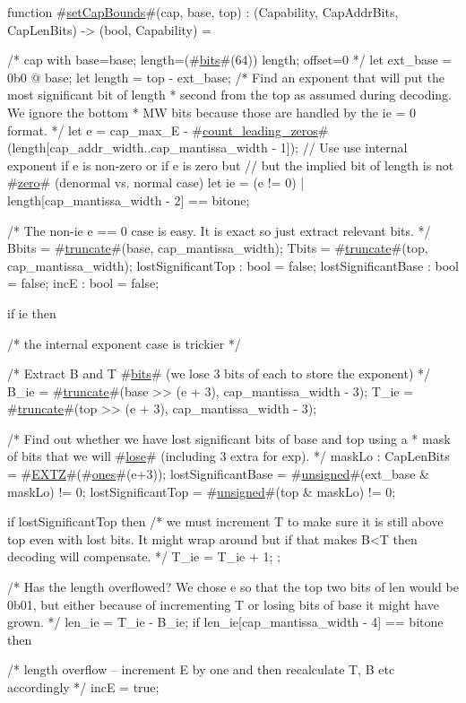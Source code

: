 function #\hyperref[sailRISCVzsetCapBounds]{setCapBounds}#(cap, base, top) : (Capability, CapAddrBits, CapLenBits) -> (bool, Capability) = {
  /* {cap with base=base; length=(#\hyperref[sailRISCVzbits]{bits}#(64)) length; offset=0} */
  let ext_base = 0b0 @ base;
  let length = top - ext_base;
  /* Find an exponent that will put the most significant bit of length
   * second from the top as assumed during decoding. We ignore the bottom
   * MW bits because those are handled by the ie = 0 format.
   */
  let e = cap_max_E - #\hyperref[sailRISCVzcountzyleadingzyzzeros]{count\_leading\_zeros}#(length[cap_addr_width..cap_mantissa_width - 1]);
  // Use use internal exponent if e is non-zero or if e is zero but
  // but the implied bit of length is not #\hyperref[sailRISCVzzzero]{zero}# (denormal vs. normal case)
  let ie = (e != 0) | length[cap_mantissa_width - 2] == bitone;

  /* The non-ie e == 0 case is easy. It is exact so just extract relevant bits. */
  Bbits = #\hyperref[sailRISCVztruncate]{truncate}#(base, cap_mantissa_width);
  Tbits = #\hyperref[sailRISCVztruncate]{truncate}#(top, cap_mantissa_width);
  lostSignificantTop : bool = false;
  lostSignificantBase : bool = false;
  incE : bool = false;

  if ie then {
    /* the internal exponent case is trickier */

    /* Extract B and T #\hyperref[sailRISCVzbits]{bits}# (we lose 3 bits of each to store the exponent) */
    B_ie = #\hyperref[sailRISCVztruncate]{truncate}#(base >> (e + 3), cap_mantissa_width - 3);
    T_ie = #\hyperref[sailRISCVztruncate]{truncate}#(top >> (e + 3), cap_mantissa_width - 3);

    /* Find out whether we have lost significant bits of base and top using a
     * mask of bits that we will #\hyperref[sailRISCVzlose]{lose}# (including 3 extra for exp).
     */
    maskLo : CapLenBits = #\hyperref[sailRISCVzEXTZ]{EXTZ}#(#\hyperref[sailRISCVzones]{ones}#(e+3));
    lostSignificantBase = #\hyperref[sailRISCVzunsigned]{unsigned}#(ext_base & maskLo) != 0;
    lostSignificantTop  = #\hyperref[sailRISCVzunsigned]{unsigned}#(top & maskLo) != 0;

    if lostSignificantTop then {
      /* we must increment T to make sure it is still above top even with lost bits.
         It might wrap around but if that makes B<T then decoding will compensate. */
      T_ie = T_ie + 1;
    };

    /* Has the length overflowed? We chose e so that the top two bits of len would be 0b01,
       but either because of incrementing T or losing bits of base it might have grown. */
    len_ie = T_ie - B_ie;
    if len_ie[cap_mantissa_width - 4] == bitone then {
      /* length overflow -- increment E by one and then recalculate
         T, B etc accordingly */
      incE = true;

}}}
